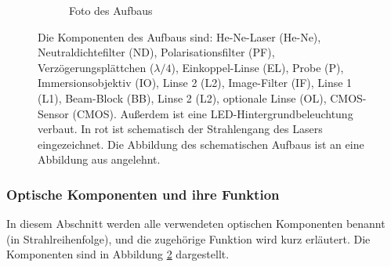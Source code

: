 \documentclass[titlepage,  ngerman]{article}
\begin{document}
\begin{figure}[h]
\begin{subfigure}{0.9\textwidth}
			\caption{Foto des Aufbaus}
			\label{fig:aufsicht_aufbau_anotated}
		\end{subfigure}
		\caption[Versuchsaufbau]{Die Komponenten des Aufbaus sind: He-Ne-Laser (He-Ne), Neutraldichtefilter (ND), Polarisationsfilter (PF), Verzögerungsplättchen ($\lambda/4$), Einkoppel-Linse (EL), Probe (P), Immersionsobjektiv (IO), Linse 2 (L2), Image-Filter (IF), Linse 1 (L1), Beam-Block (BB), Linse 2 (L2), optionale Linse (OL), CMOS-Sensor (CMOS). Außerdem ist eine LED-Hintergrundbeleuchtung verbaut. In rot ist schematisch der Strahlengang des Lasers eingezeichnet. Die Abbildung des schematischen Aufbaus ist an eine Abbildung aus \cite{Jaruschewski.2020} angelehnt.}
		\label{fig:Aufbau}
	\end{figure}
	\subsubsection{Optische Komponenten und ihre Funktion}
		In diesem Abschnitt werden alle verwendeten optischen Komponenten benannt (in Strahlreihenfolge), und die zugehörige Funktion wird kurz erläutert. Die Komponenten sind in Abbildung \ref{fig:Aufbau} dargestellt.
\end{document}
